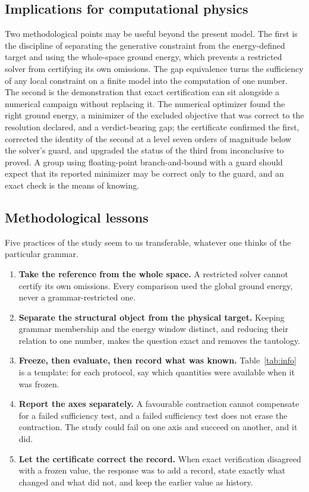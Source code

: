 \documentclass[11pt,a4paper]{article}
\theoremstyle{plain}
\theoremstyle{definition}
\theoremstyle{remark}
\begin{document}
\subsection{Implications for computational physics}
Two methodological points may be useful beyond the present model. The first is the discipline of separating the generative constraint from the energy-defined target and using the whole-space ground energy, which prevents a restricted solver from certifying its own omissions. The gap equivalence turns the sufficiency of any local constraint on a finite model into the computation of one number. The second is the demonstration that exact certification can sit alongside a numerical campaign without replacing it. The numerical optimizer found the right ground energy, a minimizer of the excluded objective that was correct to the resolution declared, and a verdict-bearing gap; the certificate confirmed the first, corrected the identity of the second at a level seven orders of magnitude below the solver's guard, and upgraded the status of the third from inconclusive to proved. A group using floating-point branch-and-bound with a guard should expect that its reported minimizer may be correct only to the guard, and an exact check is the means of knowing.

\subsection{Methodological lessons}
Five practices of the study seem to us transferable, whatever one thinks of the particular grammar.
\begin{enumerate}
\item \textbf{Take the reference from the whole space.} A restricted solver cannot certify its own omissions. Every comparison used the global ground energy, never a grammar-restricted one.
\item \textbf{Separate the structural object from the physical target.} Keeping grammar membership and the energy window distinct, and reducing their relation to one number, makes the question exact and removes the tautology.
\item \textbf{Freeze, then evaluate, then record what was known.} Table~\ref{tab:info} is a template: for each protocol, say which quantities were available when it was frozen.
\item \textbf{Report the axes separately.} A favourable contraction cannot compensate for a failed sufficiency test, and a failed sufficiency test does not erase the contraction. The study could fail on one axis and succeed on another, and it did.
\item \textbf{Let the certificate correct the record.} When exact verification disagreed with a frozen value, the response was to add a record, state exactly what changed and what did not, and keep the earlier value as history.
\end{enumerate}
\end{document}
